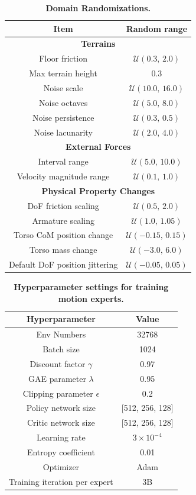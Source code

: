 \documentclass{llmxive}
\begin{document}
\begin{table}[t!]
    \centering
    \begin{tabular}{cc}
    \toprule
    Item & Random range \\
    \midrule
    \multicolumn{2}{c}{\textbf{Terrains}} \\
    Floor friction & $\mathcal{U}(0.3,\, 2.0)$ \\
    Max terrain height & $0.3$ \\
    Noise scale & $\mathcal{U}(10.0,\, 16.0)$ \\
    Noise octaves & $\mathcal{U}(5.0,\, 8.0)$ \\
    Noise persistence & $\mathcal{U}(0.3,\, 0.5)$ \\
    Noise lacunarity & $\mathcal{U}(2.0,\, 4.0)$ \\
    \midrule
    \multicolumn{2}{c}{\textbf{External Forces}} \\
    Interval range & $\mathcal{U}(5.0,\, 10.0)$ \\
    Velocity magnitude range & $\mathcal{U}(0.1,\, 1.0)$ \\
    \midrule
    \multicolumn{2}{c}{\textbf{Physical Property Changes}} \\
    DoF friction scaling & $\mathcal{U}(0.5,\, 2.0)$ \\
    Armature scaling & $\mathcal{U}(1.0,\, 1.05)$ \\
    Torso CoM position change & $\mathcal{U}(-0.15,\, 0.15)$ \\
    Torso mass change & $\mathcal{U}(-3.0,\, 6.0)$ \\
    Default DoF position jittering & $\mathcal{U}(-0.05,\, 0.05)$ \\
    \bottomrule
    \end{tabular}
\caption{\textbf{Domain Randomizations.}}
\label{tab:dr_items}
\end{table}


\begin{table}[t!]
    \centering
    \begin{tabular}{cc}
    \toprule
    Hyperparameter & Value \\
    \midrule
    Env Numbers & 32768 \\
    Batch size & 1024 \\
    Discount factor $\gamma$ & 0.97 \\
    GAE parameter $\lambda$ & 0.95 \\
    Clipping parameter $\epsilon$ & 0.2 \\
    Policy network size & [512, 256, 128] \\
    Critic network size & [512, 256, 128] \\
    Learning rate & $3\times10^{-4}$ \\
    Entropy coefficient & 0.01 \\
    Optimizer & Adam \\
    Training iteration per expert & 3B \\
    \bottomrule
    \end{tabular}
\caption{\textbf{Hyperparameter settings for training motion experts.}}
\label{tab:ppo_hyperparams}
\end{table}
\end{document}

